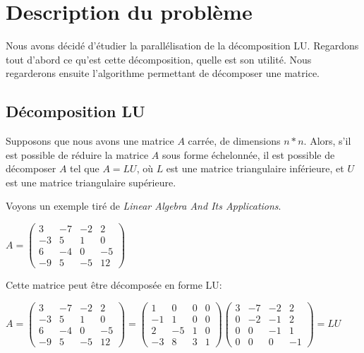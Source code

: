 \documentclass[12pt,letterpaper]{article} %
\begin{document}

\tableofcontents %

\newpage %



\section{Description du problème}

Nous avons décidé d'étudier la parallélisation de la décomposition LU. Regardons tout d'abord ce qu'est
cette décomposition, quelle est son utilité. Nous regarderons ensuite l'algorithme permettant de
décomposer une matrice.

\subsection{Décomposition LU}

Supposons que nous avons une matrice $A$ carrée, de dimensions $n*n$. Alors, s'il est possible de
réduire la matrice $A$ sous forme échelonnée, il est possible de décomposer $A$ tel que
$A = LU$, où $L$ est une matrice triangulaire inférieure, et $U$ est une matrice triangulaire supérieure\cite{lay2006LinAlgitsAppThiedi}.

Voyons un exemple tiré de \emph{Linear Algebra And Its Applications}.

$A =
\begin{pmatrix}
3 & -7 & -2 & 2 \\
-3 & 5 & 1 & 0 \\
6 & -4 & 0 & -5 \\
-9 & 5 & -5 & 12
\end{pmatrix}$

Cette matrice peut être décomposée en forme LU:

$A =
\begin{pmatrix}
3 & -7 & -2 & 2 \\
-3 & 5 & 1 & 0 \\
6 & -4 & 0 & -5 \\
-9 & 5 & -5 & 12
\end{pmatrix} 
=
\begin{pmatrix}
1 & 0 & 0 & 0 \\
-1 & 1 & 0 & 0 \\
2 & -5 & 1 & 0 \\
-3 & 8 & 3 & 1
\end{pmatrix}
\begin{pmatrix}
3 & -7 & -2 & 2 \\
0 & -2 & -1 & 2 \\
0 & 0 & -1 & 1 \\
0 & 0 & 0 & -1
\end{pmatrix} 
= LU$
\end{document}
